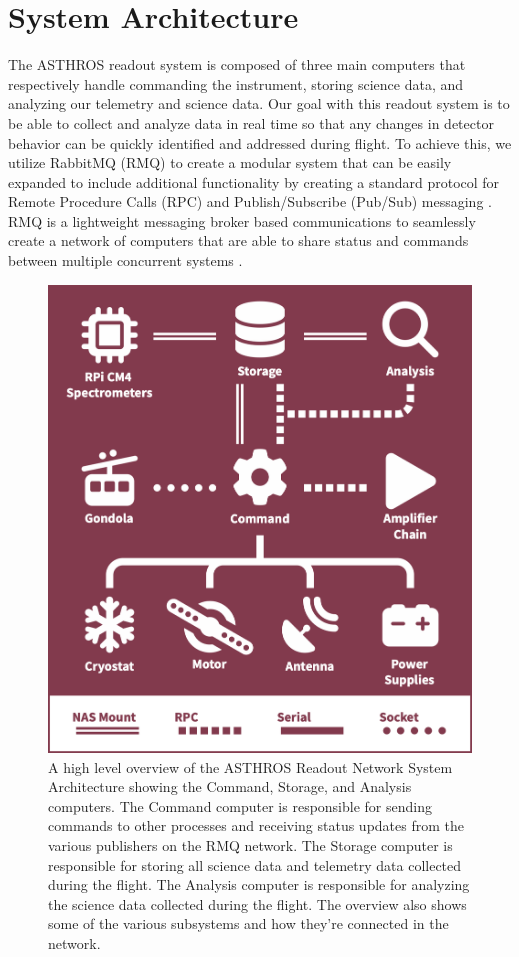 \section{System Architecture}
\label{chap3/sec:system}
The ASTHROS readout system is composed of three main computers that respectively handle commanding the instrument, storing science data, and analyzing our telemetry and science data. 
Our goal with this readout system is to be able to collect and analyze data in real time so that any changes in detector behavior can be quickly identified and addressed during flight. 
To achieve this, we utilize RabbitMQ (RMQ) to create a modular system that can be easily expanded to include additional functionality by creating a standard protocol for Remote Procedure Calls (RPC) and Publish/Subscribe (Pub/Sub) messaging \cite{dobbelaere2017kafkaversusrabbitmq}.
RMQ is a lightweight messaging broker based communications to seamlessly create a network of computers that are able to share status and commands between multiple concurrent systems \cite{thompson2024architecture}.

\begin{figure}
    \centering
    \includegraphics[width=0.5\linewidth]{figs/3/system.png}
    \caption{A high level overview of the ASTHROS Readout Network System Architecture showing the Command, Storage, and Analysis computers. The Command computer is responsible for sending commands to other processes and receiving status updates from the various publishers on the RMQ network. The Storage computer is responsible for storing all science data and telemetry data collected during the flight. The Analysis computer is responsible for analyzing the science data collected during the flight. The overview also shows some of the various subsystems and how they're connected in the network.}
    \label{chap3/fig:system}
\end{figure}

